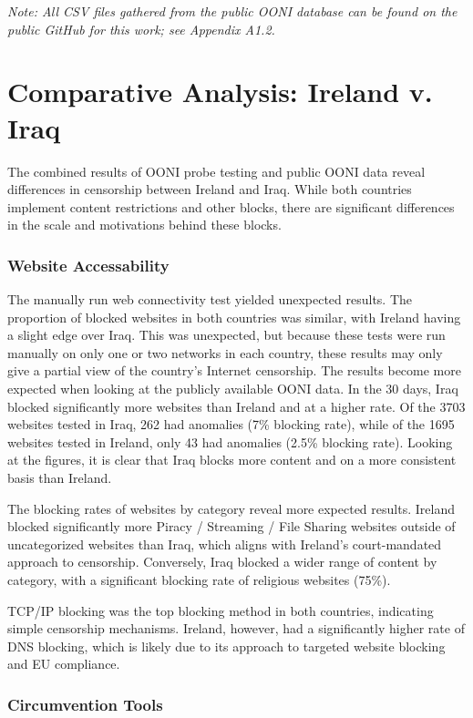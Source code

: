 \textit{Note: All CSV files gathered from the public OONI database can be found on the public GitHub for this work; see Appendix A1.2.}


\section{Comparative Analysis: Ireland v. Iraq}

The combined results of OONI probe testing and public OONI data reveal differences in censorship between Ireland and Iraq. While both countries implement content restrictions and other blocks, there are significant differences in the scale and motivations behind these blocks.

\subsubsection{Website Accessability}

The manually run web connectivity test yielded unexpected results. The proportion of blocked websites in both countries was similar, with Ireland having a slight edge over Iraq. This was unexpected, but because these tests were run manually on only one or two networks in each country, these results may only give a partial view of the country's Internet censorship. The results become more expected when looking at the publicly available OONI data. In the 30 days, Iraq blocked significantly more websites than Ireland and at a higher rate. Of the 3703 websites tested in Iraq, 262 had anomalies (7\% blocking rate), while of the 1695 websites tested in Ireland, only 43 had anomalies (2.5\% blocking rate). Looking at the figures, it is clear that Iraq blocks more content and on a more consistent basis than Ireland.

The blocking rates of websites by category reveal more expected results. Ireland blocked significantly more Piracy / Streaming / File Sharing websites outside of uncategorized websites than Iraq, which aligns with Ireland's court-mandated approach to censorship. Conversely, Iraq blocked a wider range of content by category, with a significant blocking rate of religious websites (75\%).

TCP/IP blocking was the top blocking method in both countries, indicating simple censorship mechanisms. Ireland, however, had a significantly higher rate of DNS blocking, which is likely due to its approach to targeted website blocking and EU compliance.

\subsubsection{Circumvention Tools}


